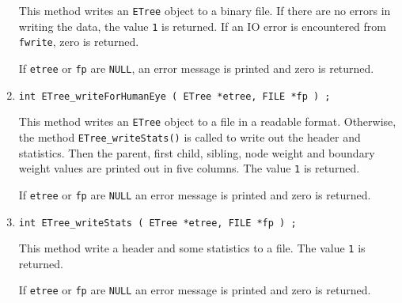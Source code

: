 \begin{enumerate}
\begin{verbatim}
\end{verbatim}
\par
This method writes an {\tt ETree} object to a binary file.
If there are no errors in writing the data, 
the value {\tt 1} is returned.
If an IO error is encountered from {\tt fwrite}, zero is returned.
\par {}
If {\tt etree} or {\tt fp} are {\tt NULL},
an error message is printed and zero is returned.
\item
\begin{verbatim}
int ETree_writeForHumanEye ( ETree *etree, FILE *fp ) ;
\end{verbatim}
\par
This method writes an {\tt ETree} object to a file in a readable
format.
Otherwise, the method {\tt ETree\_writeStats()} 
is called to write out the
header and statistics. 
Then the parent, first child, sibling, node weight and boundary
weight values are printed out in five columns.
The value {\tt 1} is returned.
\par {}
If {\tt etree} or {\tt fp} are {\tt NULL} an error message 
is printed and zero is returned.
\item
\begin{verbatim}
int ETree_writeStats ( ETree *etree, FILE *fp ) ;
\end{verbatim}
\par
This method write a header and some statistics to a file.
The value {\tt 1} is returned.
\par {}
If {\tt etree} or {\tt fp} are {\tt NULL} an error message 
is printed and zero is returned.
\end{enumerate}
